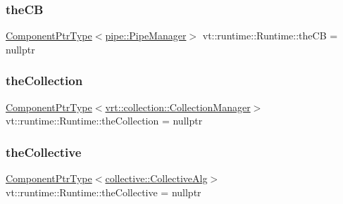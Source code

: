 \mbox{\label{structvt_1_1runtime_1_1_runtime_a8f4f5ea53aed7d2302bc52a39c16de0b}} 
\subsubsection{\texorpdfstring{the\+CB}{theCB}}
{\footnotesize\ttfamily \hyperlink{structvt_1_1runtime_1_1_runtime_a0893bf0a8c03b898e8ab66b52cec80ad}{Component\+Ptr\+Type}$<$\hyperlink{structvt_1_1pipe_1_1_pipe_manager}{pipe\+::\+Pipe\+Manager}$>$ vt\+::runtime\+::\+Runtime\+::the\+CB = nullptr}

\mbox{\label{structvt_1_1runtime_1_1_runtime_a9c74bf08aceff27fa43330d3f1c8d581}} 
\subsubsection{\texorpdfstring{the\+Collection}{theCollection}}
{\footnotesize\ttfamily \hyperlink{structvt_1_1runtime_1_1_runtime_a0893bf0a8c03b898e8ab66b52cec80ad}{Component\+Ptr\+Type}$<$\hyperlink{structvt_1_1vrt_1_1collection_1_1_collection_manager}{vrt\+::collection\+::\+Collection\+Manager}$>$ vt\+::runtime\+::\+Runtime\+::the\+Collection = nullptr}

\mbox{\label{structvt_1_1runtime_1_1_runtime_a52b4a07eacf90a576f077e193604eab9}} 
\subsubsection{\texorpdfstring{the\+Collective}{theCollective}}
{\footnotesize\ttfamily \hyperlink{structvt_1_1runtime_1_1_runtime_a0893bf0a8c03b898e8ab66b52cec80ad}{Component\+Ptr\+Type}$<$\hyperlink{structvt_1_1collective_1_1_collective_alg}{collective\+::\+Collective\+Alg}$>$ vt\+::runtime\+::\+Runtime\+::the\+Collective = nullptr}

